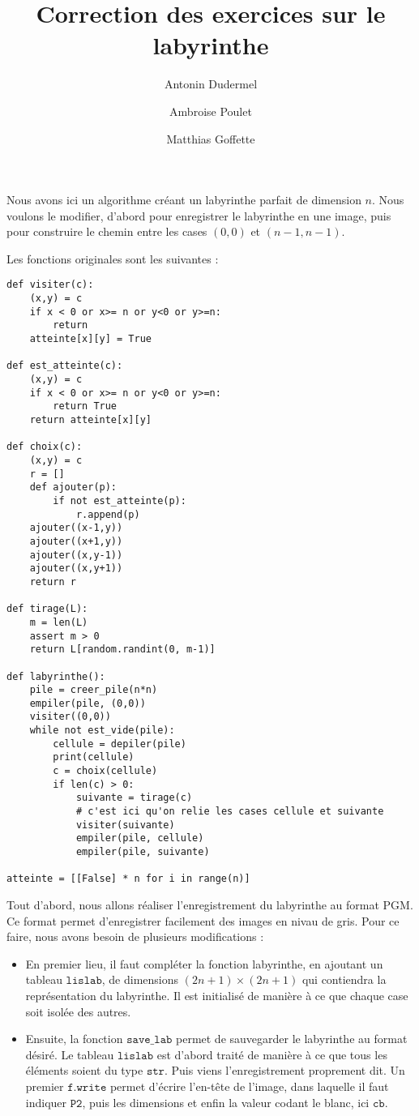 \documentclass[11pt,a4paper]{article}
\title{Correction des exercices sur le labyrinthe}
\date{}
\author{Antonin Dudermel \and Ambroise Poulet \and Matthias Goffette}
\begin{document}

\maketitle

\begin{it}
Nous avons ici un algorithme créant un labyrinthe parfait de dimension $n$. Nous voulons le modifier, d'abord pour enregistrer le labyrinthe en une image, puis pour construire le chemin entre les cases $(0,0)$ et $(n-1,n-1)$.
\end{it}
\par
Les fonctions originales sont les suivantes :

\begin{lstlisting}
def visiter(c):
    (x,y) = c
    if x < 0 or x>= n or y<0 or y>=n:
        return
    atteinte[x][y] = True

def est_atteinte(c):
    (x,y) = c
    if x < 0 or x>= n or y<0 or y>=n:
        return True
    return atteinte[x][y]

def choix(c):
    (x,y) = c
    r = []
    def ajouter(p):
        if not est_atteinte(p):
            r.append(p)
    ajouter((x-1,y))
    ajouter((x+1,y))
    ajouter((x,y-1))
    ajouter((x,y+1))
    return r

def tirage(L):
    m = len(L)
    assert m > 0
    return L[random.randint(0, m-1)]

def labyrinthe():
    pile = creer_pile(n*n)
    empiler(pile, (0,0))
    visiter((0,0))
    while not est_vide(pile):
        cellule = depiler(pile)
        print(cellule)
        c = choix(cellule)
        if len(c) > 0:
            suivante = tirage(c)
            # c'est ici qu'on relie les cases cellule et suivante
            visiter(suivante)
            empiler(pile, cellule)
            empiler(pile, suivante)
            
atteinte = [[False] * n for i in range(n)]
\end{lstlisting}
\par
Tout d'abord, nous allons réaliser l'enregistrement du labyrinthe au format PGM. Ce format permet d'enregistrer facilement des images en nivau de gris. Pour ce faire, nous avons besoin de plusieurs modifications :
\begin{itemize}
	\item En premier lieu, il faut compléter la fonction labyrinthe, en ajoutant un tableau $\mathtt{lislab}$, de dimensions $(2n+1) \times (2n+1)$ qui contiendra la représentation du labyrinthe. Il est initialisé de manière à ce que chaque case soit isolée des autres.
	\item Ensuite, la fonction $\mathtt{save\_lab}$ permet de sauvegarder le labyrinthe au format désiré. Le tableau $\mathtt{lislab}$ est d'abord traité de manière à ce que tous les éléments soient du type $\mathtt{str}$. Puis viens l'enregistrement proprement dit. Un premier $\mathtt{f.write}$ permet d'écrire l'en-tête de l'image, dans laquelle il faut indiquer $\mathtt{P2}$, puis les dimensions et enfin la valeur codant le blanc, ici $\mathtt{cb}$.
\end{itemize}
\end{document}

